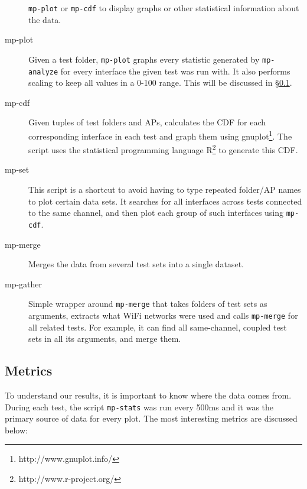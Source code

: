\begin{description}
    \texttt{mp-plot} or \texttt{mp-cdf} to display graphs or other statistical
    information about the data.
  \item[mp-plot]
    Given a test folder, \texttt{mp-plot} graphs every statistic generated by
    \texttt{mp-analyze} for every interface the given test was run with. It also
    performs scaling to keep all values in a 0-100 range. This will be discussed
    in \S\ref{sec:met:metrics}.
  \item[mp-cdf]
    Given tuples of test folders and APs, calculates the CDF for each
    corresponding interface in each test and graph them using
    gnuplot\footnote{http://www.gnuplot.info/}. The script uses the statistical
    programming language R\footnote{http://www.r-project.org/} to generate this
    CDF.
  \item[mp-set]
    This script is a shortcut to avoid having to type repeated folder/AP names
    to plot certain data sets. It searches for all interfaces across tests
    connected to the same channel, and then plot each group of such interfaces
    using \texttt{mp-cdf}.
  \item[mp-merge]
    Merges the data from several test sets into a single dataset.
  \item[mp-gather]
    Simple wrapper around \texttt{mp-merge} that takes folders of test sets as
    arguments, extracts what WiFi networks were used and calls \texttt{mp-merge}
    for all related tests. For example, it can find all same-channel, coupled
    test sets in all its arguments, and merge them.
\end{description}

\subsection{Metrics}
\label{sec:met:metrics}
To understand our results, it is important to know where the data comes from.
During each test, the script \texttt{mp-stats} was run every 500ms and it was
the primary source of data for every plot. The most interesting metrics are
discussed below:

